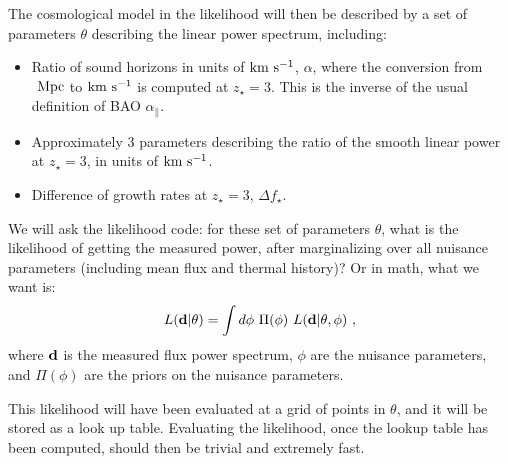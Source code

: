 The cosmological model in the likelihood will then be described by a 
set of parameters $\theta$ describing the linear power spectrum, including:
\begin{itemize}
 \item Ratio of sound horizons in units of ${\rm km~s^{-1}}$, $\alpha$, where the 
conversion from $\ \text{Mpc}$ to ${\rm km~s^{-1}}$ is computed at $z_\star=3$. 
This is the inverse of the usual definition of BAO $\alpha_\parallel$.
 \item Approximately 3 parameters describing the ratio of the smooth
  linear power at $z_\star=3$, in units of ${\rm km~s^{-1}}$.
 \item Difference of growth rates at $z_\star=3$, $\Delta f_\star$. 
\end{itemize}

We will ask the likelihood code: for these set of parameters $\theta$,
what is the likelihood of getting the measured power, after marginalizing
over all nuisance parameters (including mean flux and thermal history)?
Or in math, what we want is:
\begin{equation} \label{eq:marg}
 L(\mathbf{d} | \theta)
  = \int d\phi ~ \Pi(\phi) ~ L(\mathbf{d} | \theta, \phi) ~,
\end{equation}
where $\mathbf{d}$ is the measured flux power spectrum, $\phi$ are the nuisance
parameters, and $\Pi(\phi)$ are the priors on the nuisance parameters.

This likelihood will have been evaluated at a grid of points in $\theta$,
and it will be stored as a look up table.
Evaluating the likelihood, once the lookup table has been computed,
should then be trivial and extremely fast.

